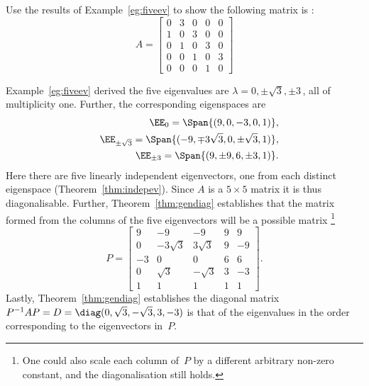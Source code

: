 \begin{example} \label{eg:fiveevp}
Use the results of Example~\ref{eg:fiveev} to show the following matrix is :
\begin{equation*}
A=\begin{bmatrix}0&3&0&0&0
\\1&0&3&0&0
\\0&1&0&3&0
\\0&0&1&0&3
\\0&0&0&1&0\end{bmatrix}
\end{equation*}
\begin{solution} 
Example~\ref{eg:fiveev} derived the five eigenvalues are  \(\lambda=0,\pm\sqrt3,\pm3\)\,, all of multiplicity one.
Further, the corresponding eigenspaces are
\begin{eqnarray*}
&&\EE_0=\Span\{(9,0,-3,0,1)\},
\\&&\EE_{\pm\sqrt3}=\Span\{(-9,\mp3\sqrt3,0,\pm\sqrt3,1)\},
\\&&\EE_{\pm3}=\Span\{(9,\pm9,6,\pm3,1)\}.
\end{eqnarray*}
Here there are five linearly independent eigenvectors, one from each distinct eigenspace  (Theorem~\ref{thm:indepev}).
Since \(A\) is a \(5\times5\) matrix it is thus diagonalisable.
Further, Theorem~\ref{thm:gendiag} establishes that the matrix formed from the columns of the five eigenvectors will be a possible matrix
\footnote{One could also scale each column of~\(P\) by a different arbitrary non-zero constant, and the diagonalisation still holds.}
\begin{equation*}
P=\begin{bmatrix} 9&-9&-9&9&9
\\0&-3\sqrt3&3\sqrt3&9&-9
\\-3&0&0&6&6
\\0&\sqrt3&-\sqrt3&3&-3
\\1&1&1&1&1
\end{bmatrix}.
\end{equation*}
Lastly, Theorem~\ref{thm:gendiag} establishes the diagonal matrix
\(P^{-1}AP=D=\diag(0,\sqrt3,-\sqrt3,3,-3)\) is that of the eigenvalues in the order corresponding to the eigenvectors in~\(P\).
\end{solution}
\end{example}






